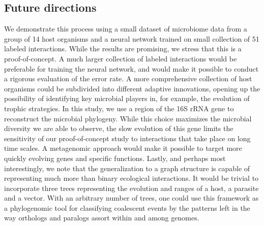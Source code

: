\subsection{Future directions}

We demonstrate this process using a small dataset of microbiome data from a group of 14 host organisms and a neural network trained on small collection of 51 labeled interactions. While the results are promising, we stress that this is a proof-of-concept. A much larger collection of labeled interactions would be preferable for training the neural network, and would make it possible to conduct a rigorous evaluation of the error rate. A more comprehensive collection of host organisms could be subdivided into different adaptive innovations, opening up the possibility of identifying key microbial players in, for example, the evolution of trophic strategies. In this study, we use a region of the 16S rRNA gene to reconstruct the microbial phylogeny. While this choice maximizes the microbial diversity we are able to observe, the slow evolution of this gene limits the sensitivity of our proof-of-concept study to interactions that take place on long time scales. A metagenomic approach would make it possible to target more quickly evolving genes and specific functions. Lastly, and perhaps most interestingly, we note that the generalization to a graph structure is capable of representing much more than binary ecological interactions. It would be trivial to incorporate three trees representing the evolution and ranges of a host, a parasite and a vector. With an arbitrary number of trees, one could use this framework as a phylogenomic tool for classifying coalescent events by the patterns left in the way orthologs and paralogs assort within and among genomes. 